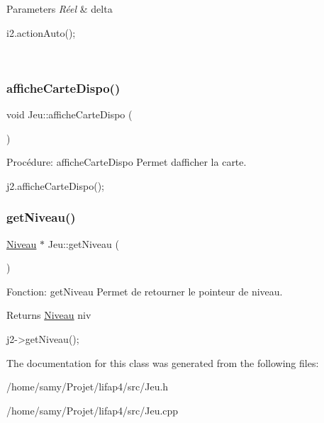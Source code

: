 \begin{DoxyParams}{Parameters}
{\em Réel} & delta 
\begin{DoxyCode}
i2.actionAuto();
\end{DoxyCode}
 \\
\hline
\end{DoxyParams}
\mbox{\label{classJeu_a4f8c73b225819fb5a6ba342adc2f1fa4}} 
\subsubsection{\texorpdfstring{affiche\+Carte\+Dispo()}{afficheCarteDispo()}}
{\footnotesize\ttfamily void Jeu\+::affiche\+Carte\+Dispo (\begin{DoxyParamCaption}{ }\end{DoxyParamCaption})}



Procédure\+: affiche\+Carte\+Dispo Permet d\textquotesingle{}afficher la carte. 


\begin{DoxyCode}
j2.afficheCarteDispo();
\end{DoxyCode}
 \mbox{\label{classJeu_a71bf0b5329ade330d95318b50d1e2f12}} 
\subsubsection{\texorpdfstring{get\+Niveau()}{getNiveau()}}
{\footnotesize\ttfamily \hyperlink{classNiveau}{Niveau} $\ast$ Jeu\+::get\+Niveau (\begin{DoxyParamCaption}{ }\end{DoxyParamCaption})}



Fonction\+: get\+Niveau Permet de retourner le pointeur de niveau. 

\begin{DoxyReturn}{Returns}
\hyperlink{classNiveau}{Niveau} niv 
\begin{DoxyCode}
j2->getNiveau();
\end{DoxyCode}
 
\end{DoxyReturn}


The documentation for this class was generated from the following files\+:\begin{DoxyCompactItemize}
\item 
/home/samy/\+Projet/lifap4/src/Jeu.\+h\item 
/home/samy/\+Projet/lifap4/src/Jeu.\+cpp\end{DoxyCompactItemize}
